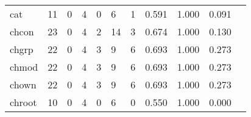 \begin{longtable}{lp{1.20cm}p{1.20cm}p{1.20cm}p{1.20cm}p{1.20cm}p{1.20cm}p{1.20cm}p{1.20cm}p{1.20cm}p{1.20cm}}
cat       &                                    11 &                                                  0 &                                                  4 &                                                  0 &                                                  6 &                                                  1 &                                         0.591 &                                              1.000 &                                              0.091 \\
chcon     &                                    23 &                                                  0 &                                                  4 &                                                  2 &                                                 14 &                                                  3 &                                         0.674 &                                              1.000 &                                              0.130 \\
chgrp     &                                    22 &                                                  0 &                                                  4 &                                                  3 &                                                  9 &                                                  6 &                                         0.693 &                                              1.000 &                                              0.273 \\
chmod     &                                    22 &                                                  0 &                                                  4 &                                                  3 &                                                  9 &                                                  6 &                                         0.693 &                                              1.000 &                                              0.273 \\
chown     &                                    22 &                                                  0 &                                                  4 &                                                  3 &                                                  9 &                                                  6 &                                         0.693 &                                              1.000 &                                              0.273 \\
chroot    &                                    10 &                                                  0 &                                                  4 &                                                  0 &                                                  6 &                                                  0 &                                         0.550 &                                              1.000 &                                              0.000 \\

\end{longtable}
